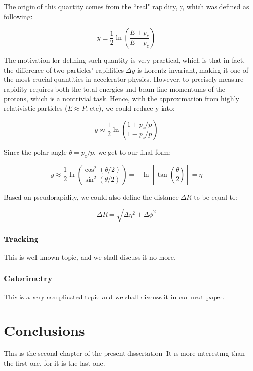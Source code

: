 \documentclass[final]{pittetd}%
\begin{document}
The origin of this quantity comes from the ``real" rapidity, y, which was defined as following:

\begin{equation}
y \equiv \frac{1}{2} \ln(\frac{E+p_z}{E-p_z})
\end{equation}

The motivation for defining such quantity is very practical, which is that in fact, the difference of two particles' rapidities $\Delta y$ is Lorentz invariant, making it one of the most crucial quantities in accelerator physics. However, to precisely measure rapidity requires both the total energies and beam-line momentums of the protons, which is a nontrivial task. Hence, with the approximation from highly relativistic particles ($E\approx P$, etc), we could reduce y into:

\begin{equation}
y \approx \frac{1}{2} \ln(\frac{1+p_z/p}{1-p_z/p})
\end{equation} 

Since the polar angle $\theta = p_z/p$, we get to our final form:

\begin{equation}
y \approx \frac{1}{2} \ln(\frac{\cos^2(\theta/2)}{\sin^2(\theta/2)}) = -\ln[\tan(\frac{\theta}{2})] = \eta
\end{equation} 

Based on pseudorapidity, we could also define the distance $\Delta R$ to be equal to:

\begin{equation}
\Delta R = \sqrt{\Delta \eta ^2 +	 \Delta \phi ^2}
\end{equation}

\subsection{Tracking}
This is well-known topic, and we shall discuss it no more.
\subsection{Calorimetry}
This is a very complicated topic and we shall discuss it in our next paper.
\chapter{Conclusions}
This is the second chapter of the present dissertation. It is more interesting than the first one, for it is the last one.
%
%
\end{document}
